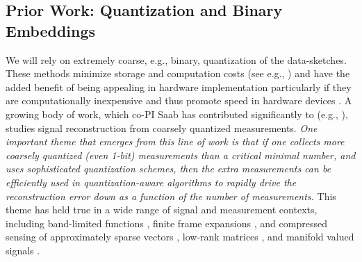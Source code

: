 \subsection{Prior Work: Quantization and Binary Embeddings}\label{sec:quant}
We will rely on extremely
coarse, e.g., binary, quantization of the data-sketches. These methods minimize storage and computation costs (see e.g., \cite{fang2014sparse,boufounos20081}) and have the added benefit of being appealing in hardware implementation particularly if they are computationally inexpensive and thus promote speed in hardware devices  \cite{jacques2013robust,le2005analog}. A growing body of work, which co-PI Saab has contributed significantly to (e.g., \cite{SaabIEEEIT,knudson2016one,saab2018quantization,LybrandSaab2018,iwen2019new, daubechies2015deterministic}), studies signal reconstruction from coarsely quantized measurements. \emph{One important theme that emerges from this line of work  is that if one collects more coarsely quantized (even 1-bit) measurements  than a critical minimal number, and uses sophisticated quantization schemes, then the extra measurements can be efficiently used in quantization-aware algorithms to rapidly drive the reconstruction error down as a function of the number of measurements.} This theme has held true in a wide range of signal and measurement contexts, including band-limited functions \cite{daubechies2015deterministic}, finite frame expansions \cite{iwen2013near},  and compressed sensing of approximately sparse vectors \cite{SaabIEEEIT, saab2018quantization}, low-rank matrices \cite{LybrandSaab2018}, and manifold valued signals \cite{iwen2019new}.

